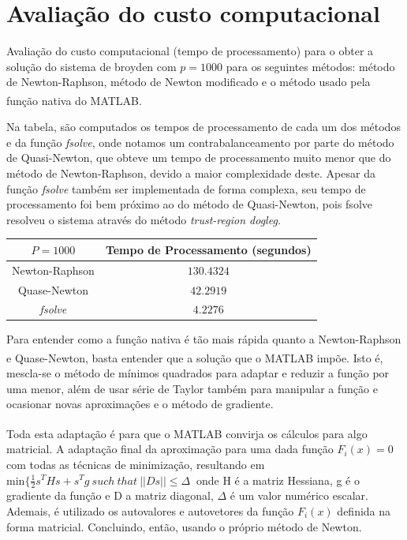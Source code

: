 \documentclass[
	12pt,				%
	oneside,			%
	a4paper,			%
	english,			%
	french,				%
	spanish,			%
	brazil				%
	]{abntex2}
\newcommand{\MATLAB}{MATLAB\textsuperscript{\textregistered}\xspace}
\begin{document}
\newpage
\section{Avaliação do custo computacional}
Avaliação do custo computacional (tempo de processamento) para o obter a solução do sistema de broyden com $p = 1000$ para os seguintes métodos: método de Newton-Raphson, método de Newton modificado e o método usado pela função nativa do \MATLAB.

Na tabela, são computados os tempos de processamento de cada um dos métodos e da função \textit{fsolve}\cite{matworksfsolve}, onde notamos um contrabalanceamento por parte do método de Quasi-Newton, que obteve um tempo de processamento muito menor que do método de Newton-Raphson, devido a maior complexidade deste. Apesar da função \textit{fsolve} também ser implementada de forma complexa, seu tempo de processamento foi bem próximo ao do método de Quasi-Newton, pois fsolve resolveu o sistema através do método \textit{trust-region dogleg.}

\begin{table}[h]
    \vspace*{0,2cm}
    \centering
    \begin{tabular}{|c|c|} \hline 
    $P = 1000$ & Tempo de Processamento (segundos) \\ \hline 
    Newton-Raphson & $130.4324$ \\ \hline 
    Quase-Newton & $42.2919$ \\ \hline 
    \textit{fsolve} & $4.2276$ \\ \hline 
    \end{tabular}
\end{table}

Para entender como a função nativa é tão mais rápida quanto a Newton-Raphson e Quase-Newton, basta entender que a solução que o \MATLAB impõe. Isto é, mescla-se o método de mínimos quadrados para adaptar e reduzir a função por uma menor, além de usar série de Taylor também para manipular a função e ocasionar novas aproximações e o método de gradiente.

Toda esta adaptação é para que o \MATLAB convirja os cálculos para algo matricial. A adaptação final da aproximação para uma dada função $F_i\left(x\right)=0$ com todas as técnicas de minimização, resultando em ${\mathrm{min} \{\frac{1}{2}s^THs+s^Tg\ such\ that\ \left|\left|Ds\right|\right|\le \Delta \ }$ onde H é a matriz Hessiana, g é o gradiente da função e D a matriz diagonal, $\Delta $ é um valor numérico escalar. Ademais, é utilizado os autovalores e autovetores da função $F_i(x)$ definida na forma matricial. Concluindo, então, usando o próprio método de Newton.
\end{document}
